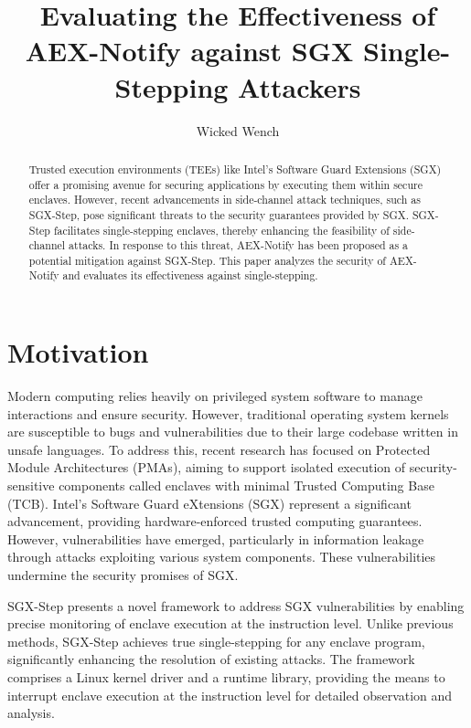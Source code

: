 \documentclass{llncs}
\title{Evaluating the Effectiveness of AEX-Notify against SGX Single-Stepping Attackers}
\author{Wicked Wench}
\institute{	University of L\"ubeck, Germany}
\begin{document}
\maketitle

\begin{abstract}
  Trusted execution environments (TEEs) like Intel's Software Guard Extensions (SGX)
  offer a promising avenue for securing applications by executing them within secure enclaves.
  However, recent advancements in side-channel attack techniques, such as SGX-Step,
  pose significant threats to the security guarantees provided by SGX.
  SGX-Step facilitates single-stepping enclaves,
  thereby enhancing the feasibility of side-channel attacks.
  In response to this threat, AEX-Notify has been proposed as a potential mitigation against SGX-Step.
  This paper analyzes the security of AEX-Notify and evaluates its effectiveness against single-stepping.
\end{abstract}


\section{Motivation}

Modern computing relies heavily on privileged system software to manage interactions and ensure security.
However, traditional operating system kernels are susceptible to bugs and vulnerabilities
due to their large codebase written in unsafe languages.
To address this, recent research has focused on Protected Module Architectures (PMAs),
aiming to support isolated execution of security-sensitive components
called enclaves with minimal Trusted Computing Base (TCB).
Intel’s Software Guard eXtensions (SGX) \cite{Intel16,Intel17} represent a significant advancement,
providing hardware-enforced trusted computing guarantees.
However, vulnerabilities have emerged, particularly in information leakage
through attacks exploiting various system components.
These vulnerabilities undermine the security promises of SGX.

SGX-Step presents a novel framework to address SGX vulnerabilities by enabling
precise monitoring of enclave execution at the instruction level.
Unlike previous methods, SGX-Step achieves true single-stepping for any enclave program,
significantly enhancing the resolution of existing attacks.
The framework comprises a Linux kernel driver and a runtime library,
providing the means to interrupt enclave execution at the instruction level
for detailed observation and analysis.
\end{document}
